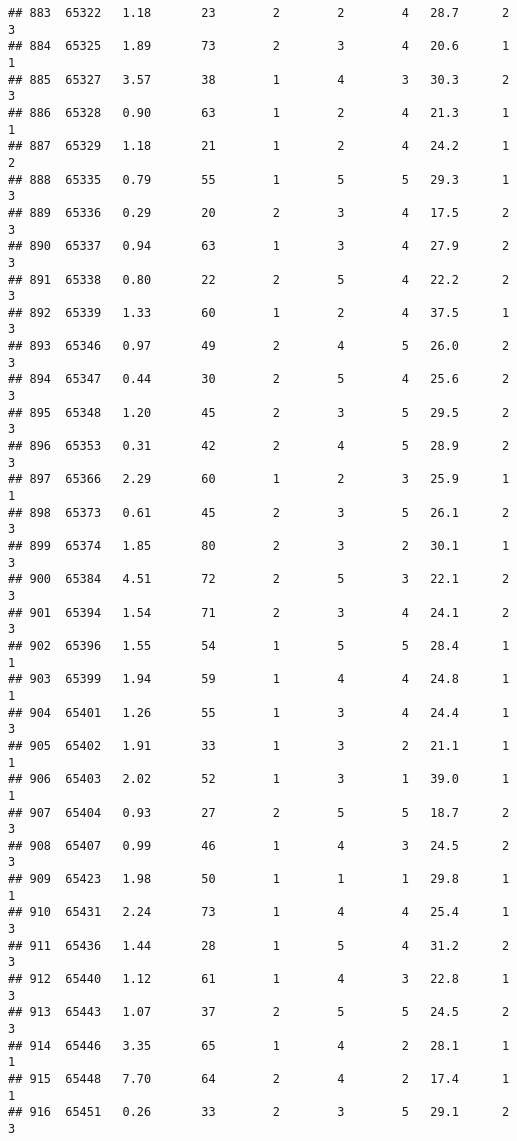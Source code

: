 \documentclass[
]{article}
\begin{document}
\begin{verbatim}
## 883  65322   1.18       23        2        2        4   28.7      2      3
## 884  65325   1.89       73        2        3        4   20.6      1      1
## 885  65327   3.57       38        1        4        3   30.3      2      3
## 886  65328   0.90       63        1        2        4   21.3      1      1
## 887  65329   1.18       21        1        2        4   24.2      1      2
## 888  65335   0.79       55        1        5        5   29.3      1      3
## 889  65336   0.29       20        2        3        4   17.5      2      3
## 890  65337   0.94       63        1        3        4   27.9      2      3
## 891  65338   0.80       22        2        5        4   22.2      2      3
## 892  65339   1.33       60        1        2        4   37.5      1      3
## 893  65346   0.97       49        2        4        5   26.0      2      3
## 894  65347   0.44       30        2        5        4   25.6      2      3
## 895  65348   1.20       45        2        3        5   29.5      2      3
## 896  65353   0.31       42        2        4        5   28.9      2      3
## 897  65366   2.29       60        1        2        3   25.9      1      1
## 898  65373   0.61       45        2        3        5   26.1      2      3
## 899  65374   1.85       80        2        3        2   30.1      1      3
## 900  65384   4.51       72        2        5        3   22.1      2      3
## 901  65394   1.54       71        2        3        4   24.1      2      3
## 902  65396   1.55       54        1        5        5   28.4      1      1
## 903  65399   1.94       59        1        4        4   24.8      1      1
## 904  65401   1.26       55        1        3        4   24.4      1      3
## 905  65402   1.91       33        1        3        2   21.1      1      1
## 906  65403   2.02       52        1        3        1   39.0      1      1
## 907  65404   0.93       27        2        5        5   18.7      2      3
## 908  65407   0.99       46        1        4        3   24.5      2      3
## 909  65423   1.98       50        1        1        1   29.8      1      1
## 910  65431   2.24       73        1        4        4   25.4      1      3
## 911  65436   1.44       28        1        5        4   31.2      2      3
## 912  65440   1.12       61        1        4        3   22.8      1      3
## 913  65443   1.07       37        2        5        5   24.5      2      3
## 914  65446   3.35       65        1        4        2   28.1      1      1
## 915  65448   7.70       64        2        4        2   17.4      1      1
## 916  65451   0.26       33        2        3        5   29.1      2      3

\end{verbatim}
\end{document}
